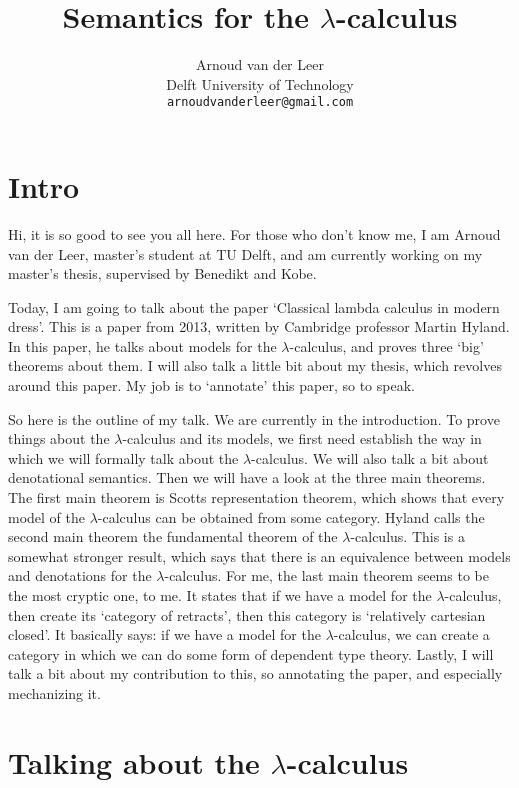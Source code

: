\documentclass{amsart}
\title{Semantics for the $ \lambda $-calculus}
\author{Arnoud van der Leer\\Delft University of Technology\\\texttt{arnoudvanderleer@gmail.com}}
\begin{document}
  \maketitle

  \section{Intro}

  Hi, it is so good to see you all here. For those who don't know me, I am Arnoud van der Leer, master's student at TU Delft, and am currently working on my master's thesis, supervised by Benedikt and Kobe.

  Today, I am going to talk about the paper `Classical lambda calculus in modern dress'. This is a paper from 2013, written by Cambridge professor Martin Hyland.
  In this paper, he talks about models for the $ \lambda $-calculus, and proves three `big' theorems about them.
  I will also talk a little bit about my thesis, which revolves around this paper. My job is to `annotate' this paper, so to speak.

  \tableofcontents

  So here is the outline of my talk. We are currently in the introduction.
  To prove things about the $ \lambda $-calculus and its models, we first need establish the way in which we will formally talk about the $ \lambda $-calculus. We will also talk a bit about denotational semantics.
  Then we will have a look at the three main theorems.
  The first main theorem is Scotts representation theorem, which shows that every model of the $ \lambda $-calculus can be obtained from some category.
  Hyland calls the second main theorem the fundamental theorem of the $ \lambda $-calculus. This is a somewhat stronger result, which says that there is an equivalence between models and denotations for the $ \lambda $-calculus.
  For me, the last main theorem seems to be the most cryptic one, to me. It states that if we have a model for the $ \lambda $-calculus, then create its `category of retracts', then this category is `relatively cartesian closed'. It basically says: if we have a model for the $ \lambda $-calculus, we can create a category in which we can do some form of dependent type theory.
  Lastly, I will talk a bit about my contribution to this, so annotating the paper, and especially mechanizing it.

  \section{Talking about the $\lambda$-calculus}
\end{document}
